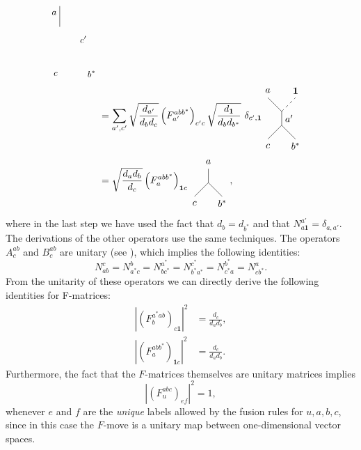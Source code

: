 \begin{align}
\begin{tikzpicture}[baseline=(current bounding box.center)]
			\draw (0.5,0.75) -- (0.5,0);
			\node at (1.35,-0.45) {\small $c'$};
			\node at (0.3,0.5) {\small $a$};
			\node at (1.65,-1.7) {\small $b^*$};
			\node at (0.35,-1.7) {\small $c$};
		\end{tikzpicture}\\
		&=\sum_{a',c'}\sqrt{\frac{d_{a'}}{d_b d_c}}\left(F_{a'}^{abb^*}\right)_{c'c}\sqrt{\frac{d_\mathbf{1}}{d_bd_{b^*}}}\ \delta_{c',\mathbf{1}}
		\begin{tikzpicture}[baseline=(current bounding box.center)]
			\draw (0,0) to node[right] {$a'$} (0,0.5);
			\draw (-0.5,-0.5) -- (0,0);
			\draw (0.5,-0.5) -- (0,0);
			\draw (0,0.5) -- (-0.5,1);
			\draw[dashed] (0,0.5) -- (0.5,1);
			\node at (-0.5,1.25) {$a$};
			\node at (0.5,1.25) {$\mathbf{1}$};
			\node at (-0.5,-0.75) {$c$};
			\node at (0.5,-0.75) {$b^*$};
		\end{tikzpicture}\\
		&=\sqrt{\frac{d_ad_b}{d_c}}\left(F_a^{abb^*}\right)_{\mathbf{1}c}
		\begin{tikzpicture}[baseline=(current bounding box.center)]
			\draw (0,0) -- (0,0.5);
			\draw (-0.5,-0.5) -- (0,0);
			\draw (0.5,-0.5) -- (0,0);
			\node at (0,0.75) {$a$};
			\node at (-0.5,-0.75) {$c$};
			\node at (0.5,-0.75) {$b^*$};
		\end{tikzpicture},
	\end{align}
where in the last step we have used the fact that $d_b=d_{b^*}$ and that $N_{a\mathbf{1}}^{a'}=\delta_{a,a'}$. The derivations of the other operators use the same techniques. The operators $A_c^{ab}$ and $B_c^{ab}$ are unitary (see \cite[Thm.\ E.6]{kitaev_anyons_2006}), which implies the following identities:	
	\begin{equation}
	\label{eq:Nidentities}
		N_{ab}^c=N_{a^*c}^b=N_{b c^*}^{a^*}=N_{b^*a^*}^{c^*}=N_{c^*a}^{b^*}=N_{cb^*}^a.
	\end{equation}
From the unitarity of these operators we can directly derive the following identities for F-matrices:
	\begin{align}
		\left|\left(F_b^{a^*ab}\right)_{c\mathbf{1}}\right|^2&=\frac{d_c}{d_a d_b},\\
		\left|\left(F_a^{abb^*}\right)_{\mathbf{1}c}\right|^2&=\frac{d_c}{d_a d_b}.\label{eq:Fidentities}
	\end{align}
Furthermore, the fact that the $F$-matrices themselves are unitary matrices implies
	\begin{equation}
	\label{eq:Funitary}
		\left|\left(F_u^{abc}\right)_{ef}\right|^2=1,
	\end{equation}
whenever $e$ and $f$ are the \emph{unique} labels allowed by the fusion rules for $u,a,b,c$, since in this case the $F$-move is a unitary map between one-dimensional vector spaces.

